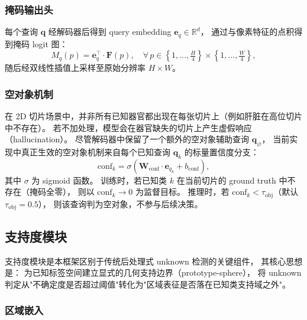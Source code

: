 \documentclass[3p,twocolumn,authoryear]{elsarticle}
\newcommand{\R}{\mathbb{R}}                              %
\newcommand{\bF}{\mathbf{F}}                              %
\newcommand{\bq}{\mathbf{q}}                              %
\newcommand{\tobj}{\tau_{\text{obj}}}                     %
\begin{document}
\subsubsection{掩码输出头}\label{sec:method:parser:mask}

每个查询 $\bq$ 经解码器后得到 query embedding $\mathbf{e}_q \in \R^d$，
通过与像素特征的点积得到掩码 logit 图：
\begin{equation}\label{eq:mask_logit}
  M_q(p) = \mathbf{e}_q^\top \cdot \bF(p), \quad \forall\, p \in \left\{1, \ldots, \tfrac{H}{4}\right\} \times \left\{1, \ldots, \tfrac{W}{4}\right\},
\end{equation}
随后经双线性插值上采样至原始分辨率 $H \times W$。

\subsubsection{空对象机制}\label{sec:method:parser:noobj}

在 2D 切片场景中，并非所有已知器官都出现在每张切片上（例如肝脏在高位切片中不存在）。
若不加处理，模型会在器官缺失的切片上产生虚假响应（hallucination）。
尽管解码器中保留了一个额外的空对象辅助查询 $\bq_{\varnothing}$，
当前实现中真正生效的空对象机制来自每个已知查询 $\bq_k$ 的标量置信度分支：
\begin{equation}\label{eq:conf}
  \text{conf}_k = \sigma\!\left(\mathbf{W}_{\text{conf}} \cdot \mathbf{e}_{q_k} + b_{\text{conf}}\right),
\end{equation}
其中 $\sigma$ 为 sigmoid 函数。
训练时，若已知类 $k$ 在当前切片的 ground truth 中不存在（掩码全零），
则以 $\text{conf}_k \to 0$ 为监督目标。
推理时，若 $\text{conf}_k < \tobj$（默认 $\tobj = 0.5$），
则该查询判为空对象，不参与后续决策。

\subsection{支持度模块}\label{sec:method:support}

支持度模块是本框架区别于传统后处理式 unknown 检测的关键组件，
其核心思想是：
为已知标签空间建立显式的几何支持边界（prototype-sphere），
将 unknown 判定从"不确定度是否超过阈值"转化为"区域表征是否落在已知类支持域之外"。

\subsubsection{区域嵌入}\label{sec:method:support:embed}
\end{document}

